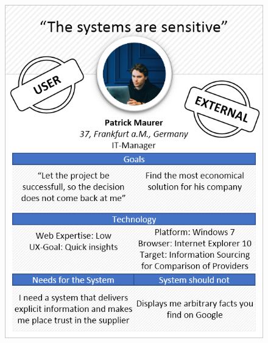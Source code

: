 \begin{figure}[H] 
        \centering\includegraphics[width=\textwidth]{img/diagrams/personas/customer4.png}
	\captionsetup{labelformat=empty}
        \caption[]{}
\end{figure}
